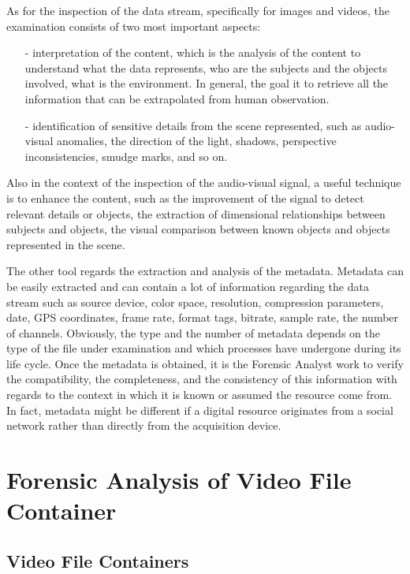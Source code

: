 As for the inspection of the data stream, specifically for images and videos, the examination consists of two most important aspects:
\begin{itemize}
\item[-] interpretation of the content, which is the analysis of the content to understand what the data represents, who are the subjects and the objects involved, what is the environment. In general, the goal it to retrieve all the information that can be extrapolated from human observation.
\item[-] identification of sensitive details from the scene represented, such as audio-visual anomalies, the direction of the light, shadows, perspective inconsistencies, smudge marks, and so on.
\end{itemize}

Also in the context of the inspection of the audio-visual signal, a useful technique is to enhance the content, such as the improvement of the signal to detect relevant details or objects, the extraction of dimensional relationships between subjects and objects, the visual comparison between known objects and objects represented in the scene.

The other tool regards the extraction and analysis of the metadata. Metadata can be easily extracted and can contain a lot of information regarding the data stream such as source device, color space, resolution, compression parameters, date, GPS coordinates, frame rate, format tags, bitrate, sample rate, the number of channels. Obviously, the type and the number of metadata depends on the type of the file under examination and which processes have undergone during its life cycle. Once the metadata is obtained, it is the Forensic Analyst work to verify the compatibility, the completeness, and the consistency \cite{Piva} of this information with regards to the context in which it is known or assumed the resource come from. In fact, metadata might be different if a digital resource originates from a social network rather than directly from the acquisition device.

\section{Forensic Analysis of Video File Container}

\subsection{Video File Containers}

